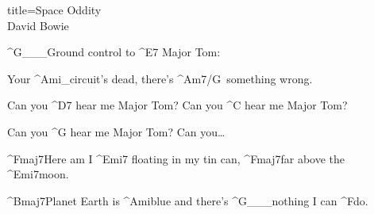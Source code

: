 \begin{song}{title=\centering Space Oddity \\\normalsize David Bowie  \vspace*{-0.3cm}}
{	^{G{\color{white}\_\_\_}}Ground control to ^{E7\,\,}Major Tom: 

	Your ^{Ami{\color{white}\_}}circuit's dead, there's ^{Am7/G\,\,\,}something wrong.

	Can you ^{D7\,\,}hear me Major Tom? Can you ^{C\,\,}hear me Major Tom? 

	Can you ^{G\,\,}hear me Major Tom? Can you\dots

	^{Fmaj7}Here am I ^{Emi7\,\,}floating in my tin can, ^{Fmaj7}far above the ^{Emi7}moon.

	^{Bmaj7}Planet Earth is ^{Ami}blue and there's ^{G{\color{white}\_\_\_}}nothing I can ^{F}do.



}
\setcounter{Slokočet}{0}
\end{song}

